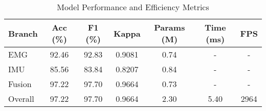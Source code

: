\begin{table}[htbp]
\centering
\caption{Model Performance and Efficiency Metrics}
\begin{tabular}{lcccccc}
\hline
Branch & Acc (\%) & F1 (\%) & Kappa & Params (M) & Time (ms) & FPS \\
\hline
EMG    & 92.46 & 92.83 & 0.9081 & 0.74 & - & - \\
IMU    & 85.56 & 83.84 & 0.8207 & 0.84 & - & - \\
Fusion & 97.22 & 97.70 & 0.9664 & 0.73 & - & - \\
Overall & 97.22 & 97.70 & 0.9664 & 2.30 & 5.40 & 2964 \\
\hline
\end{tabular}
\end{table}
